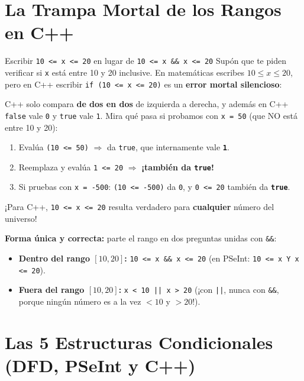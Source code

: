 \documentclass[11pt,letterpaper]{article}
\begin{document}
\section{La Trampa Mortal de los Rangos en C++}

\begin{peligro}{Escribir \texttt{10 <= x <= 20} en lugar de \texttt{10 <= x \&\& x <= 20}}
Supón que te piden verificar si \texttt{x} está entre 10 y 20 inclusive. En matemáticas escribes $10 \le x \le 20$, pero en C++ escribir \texttt{if (10 <= x <= 20)} es un \textbf{error mortal silencioso}:

C++ solo compara \textbf{de dos en dos} de izquierda a derecha, y además en C++ \texttt{false} vale \texttt{0} y \texttt{true} vale \texttt{1}. Mira qué pasa si probamos con \texttt{x = 50} (que NO está entre 10 y 20):
\begin{enumerate}
  \item Evalúa \texttt{(10 <= 50)} $\Rightarrow$ da \texttt{true}, que internamente vale \textbf{\texttt{1}}.
  \item Reemplaza y evalúa \texttt{1 <= 20} $\Rightarrow$ \textbf{¡también da \texttt{true}!}
  \item Si pruebas con \texttt{x = -500}: \texttt{(10 <= -500)} da \texttt{0}, y \texttt{0 <= 20} también da \textbf{\texttt{true}}.
\end{enumerate}
¡Para C++, \texttt{10 <= x <= 20} resulta verdadero para \textbf{cualquier} número del universo!

\textbf{Forma única y correcta:} parte el rango en dos preguntas unidas con \texttt{\&\&}:
\begin{itemize}
  \item \textbf{Dentro del rango $[10, 20]$:} \texttt{10 <= x \&\& x <= 20} (en PSeInt: \texttt{10 <= x Y x <= 20}).
  \item \textbf{Fuera del rango $[10, 20]$:} \texttt{x < 10 || x > 20} (¡con \texttt{||}, nunca con \texttt{\&\&}, porque ningún número es a la vez $< 10$ y $> 20$!).
\end{itemize}
\end{peligro}

\section{Las 5 Estructuras Condicionales (DFD, PSeInt y C++)}
\end{document}
